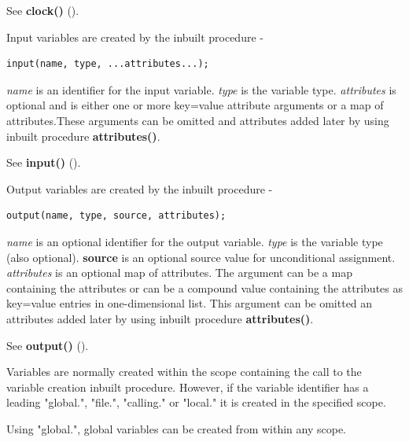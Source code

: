             See {\bf clock()} ().
           
            Input variables are created by the inbuilt procedure -
            \begin{lstlisting}[gobble=12, language=threepl]
               input(name, type, ...attributes...);
            \end{lstlisting}
            {\em name} is an identifier for the input variable.
            {\em type} is the variable type.
            {\em attributes} is optional and is either one or more key=value
            attribute arguments or a map of attributes.These arguments can be
            omitted and attributes added later by using inbuilt procedure {\bf
            attributes()}.
            
            See {\bf input()} ().
            
            Output variables are created by the inbuilt procedure -
            \begin{lstlisting}[gobble=12, language=threepl]
               output(name, type, source, attributes);
            \end{lstlisting}
            {\em name} is an optional identifier for the output variable.
            {\em type} is the variable type (also optional).
            {\bf source} is an optional source value for unconditional assignment.
            {\em attributes} is an optional map of attributes. The argument
            can be a map containing the attributes or can be a compound value
            containing the attributes as key=value entries in one-dimensional
            list. This argument can be omitted an attributes added later by
            using inbuilt procedure {\bf attributes()}.
            
            See {\bf output()} ().
            
            Variables are normally created within the scope containing the call
            to the variable creation inbuilt procedure. However, if the variable
            identifier has a leading "global.", "file.", "calling." or "local."
            it is created in the specified scope.

            Using "global.", global variables can be created from within any
            scope.

